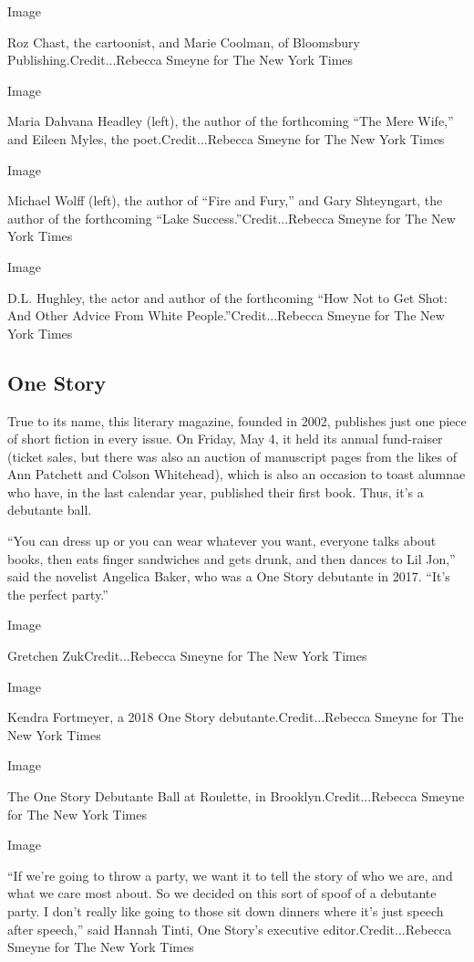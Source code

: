 Image

Roz Chast, the cartoonist, and Marie Coolman, of Bloomsbury
Publishing.Credit...Rebecca Smeyne for The New York Times

Image

Maria Dahvana Headley (left), the author of the forthcoming ``The Mere
Wife,'' and Eileen Myles, the poet.Credit...Rebecca Smeyne for The New
York Times

Image

Michael Wolff (left), the author of ``Fire and Fury,'' and Gary
Shteyngart, the author of the forthcoming ``Lake
Success.''Credit...Rebecca Smeyne for The New York Times

Image

D.L. Hughley, the actor and author of the forthcoming ``How Not to Get
Shot: And Other Advice From White People.''Credit...Rebecca Smeyne for
The New York Times

\hypertarget{one-story}{%
\subsection{One Story}\label{one-story}}

True to its name, this literary magazine, founded in 2002, publishes
just one piece of short fiction in every issue. On Friday, May 4, it
held its annual fund-raiser (ticket sales, but there was also an auction
of manuscript pages from the likes of Ann Patchett and Colson
Whitehead), which is also an occasion to toast alumnae who have, in the
last calendar year, published their first book. Thus, it's a debutante
ball.

``You can dress up or you can wear whatever you want, everyone talks
about books, then eats finger sandwiches and gets drunk, and then dances
to Lil Jon,'' said the novelist Angelica Baker, who was a One Story
debutante in 2017. ``It's the perfect party.''

Image

Gretchen ZukCredit...Rebecca Smeyne for The New York Times

Image

Kendra Fortmeyer, a 2018 One Story debutante.Credit...Rebecca Smeyne for
The New York Times

Image

The One Story Debutante Ball at Roulette, in Brooklyn.Credit...Rebecca
Smeyne for The New York Times

Image

``If we're going to throw a party, we want it to tell the story of who
we are, and what we care most about. So we decided on this sort of spoof
of a debutante party. I don't really like going to those sit down
dinners where it's just speech after speech,'' said Hannah Tinti, One
Story's executive editor.Credit...Rebecca Smeyne for The New York Times

